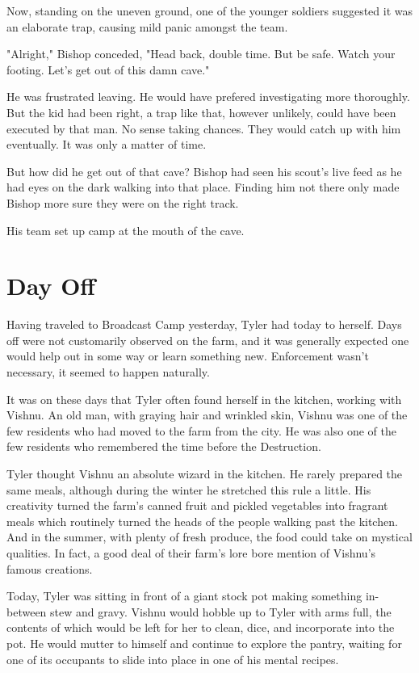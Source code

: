 \documentclass[courier]{sffms}
\begin{document}
Now, standing on the uneven ground,
one of the younger
soldiers suggested it was an elaborate trap,
causing mild panic amongst the team.

"Alright," Bishop conceded, "Head back,
double time. But be safe. Watch your
footing. Let's get out of this damn cave."

He was frustrated leaving. He would have
prefered investigating more thoroughly.
But the kid had been right, a trap like that,
however unlikely, could have been executed
by that man. No sense taking chances.
They would catch up with him eventually.
It was only a matter of time.

But how did
he get out of that cave? Bishop had
seen his scout's live feed as he had eyes
on the dark walking into that place.
Finding him not there only made Bishop
more sure they were on the right track.

His team set up camp at the mouth of
the cave.

\chapter{Day Off}
Having traveled to Broadcast Camp yesterday,
Tyler had today to herself. Days off were not
customarily observed on the farm, and it was
generally expected one would help out in some
way or learn something new. Enforcement wasn't
necessary, it seemed to happen naturally.

It was on these days that Tyler often found
herself in the kitchen, working with Vishnu.
An old man, with graying hair and wrinkled skin,
Vishnu was one of the few residents who had
moved to the farm from the city. He was also
one of the few residents who remembered the
time before the Destruction.

Tyler thought Vishnu an absolute wizard in the
kitchen. He rarely prepared the 
same meals, although
during the winter he stretched this rule a little.
His creativity turned the farm's 
canned fruit and pickled vegetables into fragrant
meals which routinely turned the heads of the people
walking past the kitchen. And in the summer,
with plenty of fresh produce, the food could
take on mystical qualities. In fact, a good deal
of their farm's lore bore mention of Vishnu's famous
creations.

Today, Tyler was sitting in front of a giant stock pot
making something in-between stew and gravy.
Vishnu would hobble up to Tyler with arms full,
the contents of which would be left for her
to clean, dice, and incorporate into the pot.
He would mutter to himself and continue to
explore the pantry, waiting for one of its occupants
to slide into place in one of his mental recipes.
\end{document}
